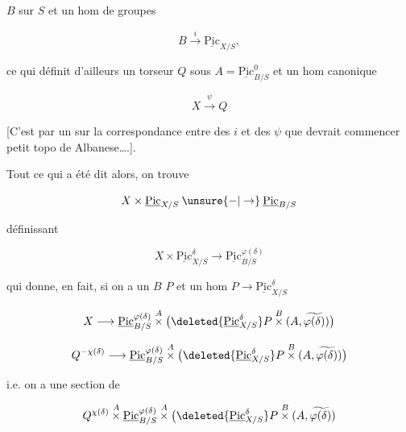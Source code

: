
$B$ sur $S$ et un hom de groupes

\[
B\xrightarrow{i}\underline{\mathrm{Pic}}_{X/S},
\]

ce qui définit d'ailleurs un torseur $Q$ sous $A=\underline{\mathrm{Pic}}^0_{B/S}$ et un hom canonique

\[
X\xrightarrow{\psi} Q
\]

[C'est par un  sur la correspondance entre des $i$ et des $\psi$ que devrait commencer   petit topo de Albanese\ldots.].

Tout ce qui a été dit  alors, on trouve

\[
X\times\underline{\mathrm{Pic}}_{X/S}\mathbin{\unsure{-|\to}}\underline{\mathrm{Pic}}_{B/S}
\]

définissant

\[
X\times\underline{\mathrm{Pic}}^\delta_{X/S}\longrightarrow\underline{\mathrm{Pic}}^{\varphi(\delta)}_{B/S}
\]


qui donne, en fait, si on a un $B$ $P$ et un hom $P\longrightarrow\underline{\mathrm{Pic}}^\delta_{X/S}$ 

\[
X\longrightarrow\underline{\mathrm{Pic}}^{\varphi(\delta)}_{B/S}\overset{A}{\times}\bigl(\deleted{\underline{\mathrm{Pic}}_{X/S}^{\delta}}P\overset{B}{\times}(A,\widetilde{\varphi(\delta)})\bigr)
\]


\[
Q^{-\chi(\delta)}\longrightarrow\underline{\mathrm{Pic}}^{\varphi(\delta)}_{B/S}\overset{A}{\times}\bigl(\deleted{\underline{\mathrm{Pic}}^\delta_{X/S}}P\overset{B}{\times}(A,\widetilde{\varphi(\delta)})\bigr)
\]

i.e. on a une section de

\[
Q^{\chi(\delta)}\overset{A}{\times}\underline{\mathrm{Pic}}^{\varphi(\delta)}_{B/S}\overset{A}{\times}\bigl(\deleted{\underline{\mathrm{Pic}}^\delta_{X/S}}P\overset{B}{\times}(A,\widetilde{\varphi(\delta)})
\]

   
